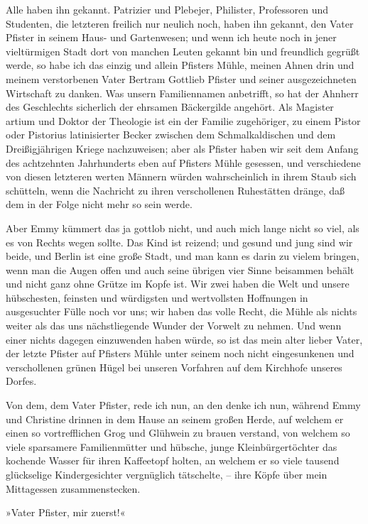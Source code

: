Alle haben ihn gekannt. Patrizier und Plebejer, Philister,
Professoren und Studenten, die letzteren freilich nur neulich noch,
haben ihn gekannt, den Vater Pfister in seinem Haus- und
Gartenwesen; und wenn ich heute noch in jener vieltürmigen Stadt
dort von manchen Leuten gekannt bin und freundlich gegrüßt werde,
so habe ich das einzig und allein Pfisters Mühle, meinen Ahnen drin
und meinem verstorbenen Vater Bertram Gottlieb Pfister und seiner
ausgezeichneten Wirtschaft zu danken. Was unsern Familiennamen
anbetrifft, so hat der Ahnherr des Geschlechts sicherlich der
ehrsamen Bäckergilde angehört. Als Magister artium und Doktor der
Theologie ist ein der Familie zugehöriger, zu einem Pistor oder
Pistorius latinisierter Becker zwischen dem Schmalkaldischen und
dem Dreißigjährigen Kriege nachzuweisen; aber als Pfister haben wir
seit dem Anfang des achtzehnten Jahrhunderts eben auf Pfisters
Mühle gesessen, und verschiedene von diesen letzteren werten
Männern würden wahrscheinlich in ihrem Staub sich schütteln, wenn
die Nachricht zu ihren verschollenen Ruhestätten dränge, daß dem in
der Folge nicht mehr so sein werde.

Aber Emmy kümmert das ja gottlob nicht, und auch mich lange nicht
so viel, als es von Rechts wegen sollte. Das Kind ist reizend; und
gesund und jung sind wir beide, und Berlin ist eine große Stadt,
und man kann es darin zu vielem bringen, wenn man die Augen offen
und auch seine übrigen vier Sinne beisammen behält und nicht ganz
ohne Grütze im Kopfe ist. Wir zwei haben die Welt und unsere
hübschesten, feinsten und würdigsten und wertvollsten Hoffnungen in
ausgesuchter Fülle noch vor uns; wir haben das volle Recht, die
Mühle als nichts weiter als das uns nächstliegende Wunder der
Vorwelt zu nehmen. Und wenn einer nichts dagegen einzuwenden haben
würde, so ist das mein alter lieber Vater, der letzte Pfister auf
Pfisters Mühle unter seinem noch nicht eingesunkenen und
verschollenen grünen Hügel bei unseren Vorfahren auf dem Kirchhofe
unseres Dorfes.

Von dem, dem Vater Pfister, rede ich nun, an den denke ich nun,
während Emmy und Christine drinnen in dem Hause an seinem großen
Herde, auf welchem er einen so vortrefflichen Grog und Glühwein zu
brauen verstand, von welchem so viele sparsamere Familienmütter und
hübsche, junge Kleinbürgertöchter das kochende Wasser für ihren
Kaffeetopf holten, an welchem er so viele tausend glückselige
Kindergesichter vergnüglich tätschelte, – ihre Köpfe über mein
Mittagessen zusammenstecken.

»Vater Pfister, mir zuerst!«

